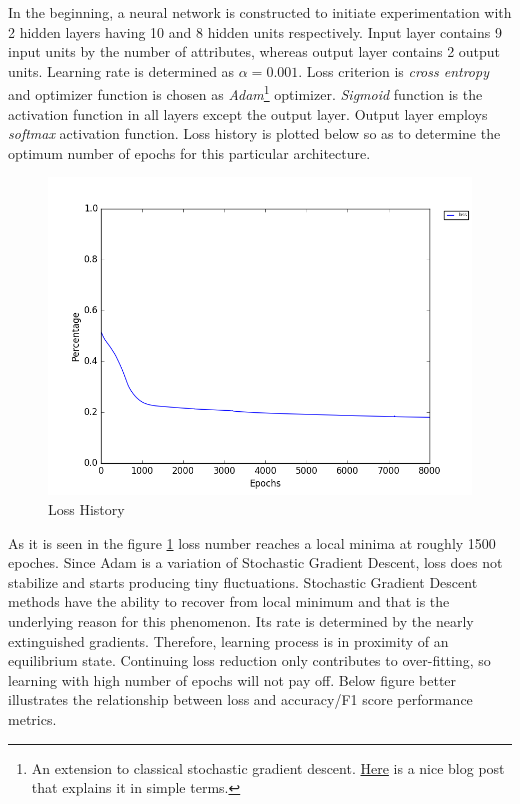 \documentclass[conference]{IEEEtran}
\begin{document}
In the beginning, a neural network is constructed to initiate experimentation with 2 hidden layers having 10 and 8 hidden units respectively. Input layer contains  9 input units by the number of attributes, whereas output layer contains 2 output units. Learning rate is determined as $\alpha = 0.001$. Loss criterion is \textit{cross entropy} and optimizer function is chosen as \textit{Adam}\footnote{An extension to classical stochastic gradient descent. \href{https://machinelearningmastery.com/adam-optimization-algorithm-for-deep-learning/}{Here} is a nice blog post that explains it in simple terms.} optimizer\cite{Adam}. \textit{Sigmoid} function is the activation function in all layers except the output layer. Output layer employs \textit{softmax} activation function. Loss history is plotted below so as to determine the optimum number of epochs for this particular architecture.\\

\begin{figure}[H]
	\includegraphics[width=1\columnwidth]{loss_plot.png}
	\caption{Loss History}
	\label{losses}
\end{figure}

As it is seen in the figure \ref{losses} loss number reaches a local minima at roughly 1500 epoches. Since Adam is a variation of Stochastic Gradient Descent, loss does not stabilize and starts producing tiny fluctuations. Stochastic Gradient Descent methods have the ability to recover from local minimum and that is the underlying reason for this phenomenon. Its rate is determined by the nearly extinguished gradients. Therefore, learning process is in proximity of an equilibrium state. Continuing loss reduction only contributes to over-fitting, so learning with high number of epochs will not pay off. Below figure better illustrates the relationship between loss and accuracy/F1 score performance metrics.\\
\end{document}
